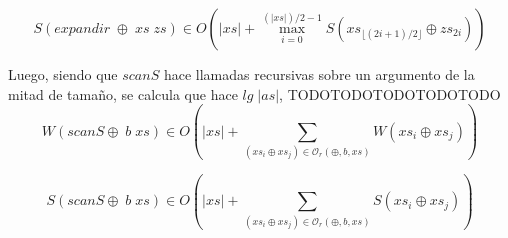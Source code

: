 \documentclass[a4paper,10pt]{article}
\begin{document}
\begin{equation*}
    S \left( expandir \;\oplus \;xs \;zs \right) \in
    O \left( \vert xs \vert + \max_{i=0}^{(\vert xs \vert)/2 - 1} S \left( xs_{\lfloor (2i+1)/2 \rfloor} \oplus zs_{2i} \right) \right)
\end{equation*}

\bigskip

    Luego, siendo que $scanS$ hace llamadas recursivas sobre un argumento de la
mitad de tamaño, se calcula que hace $lg \;\vert as \vert$, TODOTODOTODOTODOTODO
\begin{equation*}
    W \left( scanS \oplus \; b \; xs \right) \in
    O \left( \vert xs \vert + \sum_{(xs_i \oplus xs_j) \in \mathcal{O}_r(\oplus,b,xs)} W \left( xs_i \oplus xs_j \right) \right)
\end{equation*}

\begin{equation*}
    S \left( scanS \oplus \; b \; xs \right) \in
    O \left( \vert xs \vert + \sum_{(xs_i \oplus xs_j) \in \mathcal{O}_r(\oplus,b,xs)} S \left( xs_i \oplus xs_j \right) \right)
\end{equation*}




\end{document}

